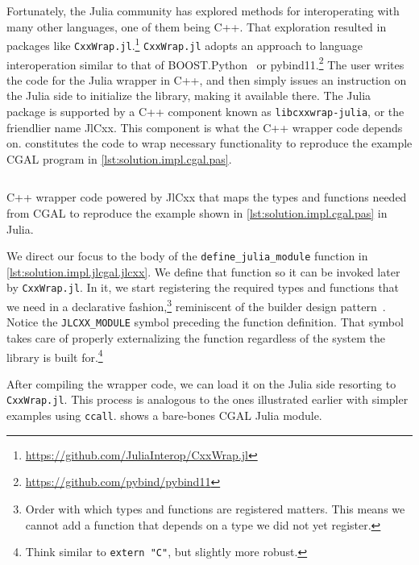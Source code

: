 Fortunately, the Julia community has explored methods for interoperating with
many other languages, one of them being C++.  That exploration resulted in
packages like 
\texttt{CxxWrap.jl}.\footnote{\url{https://github.com/JuliaInterop/CxxWrap.jl}}
\texttt{CxxWrap.jl} adopts an approach to language interoperation similar to
that of BOOST.Python~\cite{Abrahams:2003:BHSBP} or
pybind11.\footnote{\url{https://github.com/pybind/pybind11}}  The user writes
the code for the Julia wrapper in C++, and then simply issues an instruction on
the Julia side to initialize the library, making it available there.  The Julia
package is supported by a C++ component known as \texttt{libcxxwrap-julia}, or
the friendlier name JlCxx. This component is what the C++ wrapper code depends
on.   constitutes the code to wrap
necessary functionality to reproduce the example \ac{CGAL} program in
\cref{lst:solution.impl.cgal.pas}.

\begin{listing}[htbp]
  \inputminted[fontsize=\small]{cpp}{cpp/cgal_julia.cpp}
  \caption[Wrapper CxxWrap code for Three points and one segment]{
    C++ wrapper code powered by JlCxx that maps the types and functions needed
    from \acs{CGAL} to reproduce the example shown in
    \cref{lst:solution.impl.cgal.pas} in Julia.}%
  \label{lst:solution.impl.jlcgal.jlcxx}
\end{listing}

We direct our focus to the body of the \texttt{define\_julia\_module} function
in \cref{lst:solution.impl.jlcgal.jlcxx}.  We define that function so it can be
invoked later by \texttt{CxxWrap.jl}.  In it, we start registering the required
types and functions that we need in a declarative fashion,\footnote{Order with
which types and functions are registered matters.  This means we cannot add a
function that depends on a type we did not yet register.} reminiscent of the
builder design pattern~\cite{GOF:1994:DPEROOS}.  Notice the
\texttt{JLCXX\_MODULE} symbol preceding the function definition.  That symbol
takes care of properly externalizing the function regardless of the system the
library is built for.\footnote{Think similar to \texttt{extern "C"},
but slightly more robust.}

After compiling the wrapper code, we can load it on the Julia side resorting to
\texttt{CxxWrap.jl}.  This process is analogous to the ones illustrated earlier
with simpler examples using \texttt{ccall}.
 shows a bare-bones CGAL Julia module.

